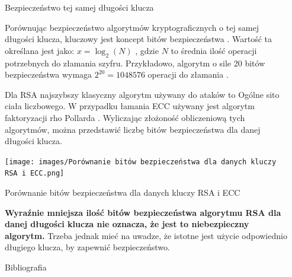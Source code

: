\documentclass[final]{beamer}
\newlength{\sepwidth}
\newlength{\colwidth}
\newcommand{\separatorcolumn}{\begin{column}{\sepwidth}\end{column}}
\begin{document}
\begin{frame}[t]
\begin{columns}[t]
\begin{column}{\colwidth}
    \begin{block}{Bezpieczeństwo tej samej długości klucza}

    Porównując bezpieczeństwo algorytmów kryptograficznych o tej samej długości klucza, kluczowy jest koncept bitów bezpieczeństwa \cite{BitSecurityOfCryptographicPrimitives}. Wartość ta określana jest jako: 
    $x = \log_2(N)$
    , gdzie \( N \) to średnia ilość operacji potrzebnych do złamania szyfru. Przykładowo, algorytm o sile 20 bitów bezpieczeństwa wymaga \( 2^{20} = 1048576 \) operacji do złamania \cite{BitSecurityOfCryptographicPrimitives}. 
    
    Dla RSA najszybszy klasyczny algorytm używany do ataków to Ogólne sito ciała liczbowego.
    W przypadku łamania ECC używany jest algorytm faktoryzacji rho Pollarda \cite{SolvingECDLP}.
    Wyliczając złożoność obliczeniową tych algorytmów, można przedstawić liczbę bitów bezpieczeństwa dla danej długości klucza.
    
    \begin{center}
        \texttt{[image: images/Porównanie bitów bezpieczeństwa dla danych kluczy RSA i ECC.png]}
        \caption{Porównanie bitów bezpieczeństwa dla danych kluczy RSA i ECC}
    \end{center}

    \textbf{Wyraźnie mniejsza ilość bitów bezpieczeństwa algorytmu RSA dla danej długości klucza nie oznacza, że jest to niebezpieczny algorytm.} Trzeba jednak mieć na uwadze, że istotne jest użycie odpowiednio długiego klucza, by zapewnić bezpieczeństwo.

    \end{block}
 
  \begin{block}{Bibliografia}
    \footnotesize{\printbibliography}
  \end{block}

\end{column}
\separatorcolumn



\end{columns}
\end{frame}
\end{document}
